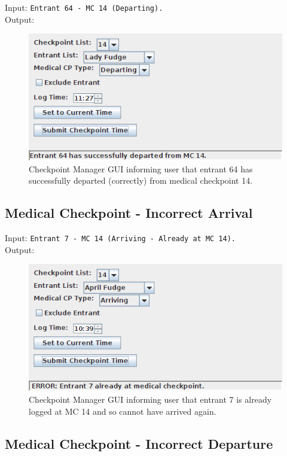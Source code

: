 \documentclass[a4paper, 10pt]{article}
\begin{document}
Input: \verb+Entrant 64 - MC 14 (Departing).+ \\

Output:
\begin{figure}[ht!]
\centering
\includegraphics[scale=0.7]{cm-mcdepartsuccess.png}
\caption{Checkpoint Manager GUI informing user that entrant 64 has successfully departed (correctly) from medical checkpoint 14.}
\end{figure}

\subsection{Medical Checkpoint - Incorrect Arrival}

Input: \verb+Entrant 7 - MC 14 (Arriving - Already at MC 14).+ \\

Output:
\begin{figure}[ht!]
\centering
\includegraphics[scale=0.7]{cm-mcarrivefailure.png}
\caption{Checkpoint Manager GUI informing user that entrant 7 is already logged at MC 14 and so cannot have arrived again.}
\end{figure}

\clearpage
\subsection{Medical Checkpoint - Incorrect Departure}
\end{document}
